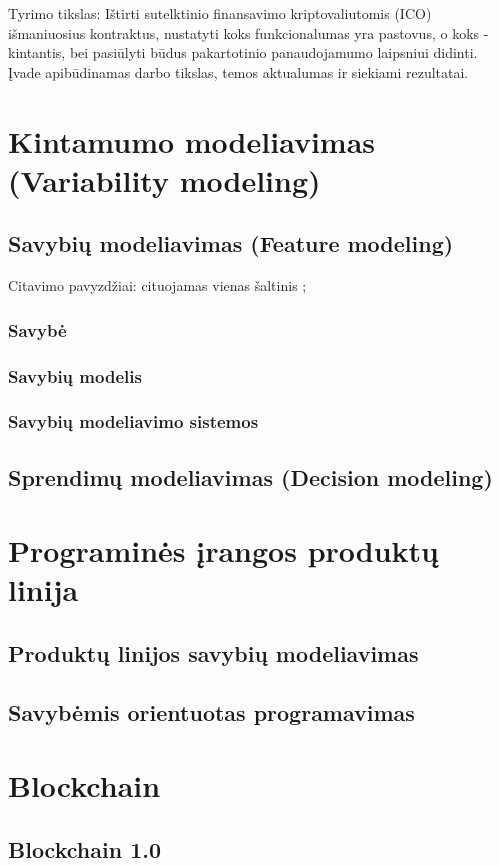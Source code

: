 \documentclass{VUMIFInfKursinis}
\begin{document}
Tyrimo tikslas: Ištirti sutelktinio finansavimo kriptovaliutomis (ICO) išmaniuosius kontraktus, nustatyti koks funkcionalumas yra pastovus, o koks - kintantis, bei pasiūlyti būdus pakartotinio panaudojamumo laipsniui didinti.
Įvade apibūdinamas darbo tikslas, temos aktualumas ir siekiami rezultatai.

\section{Kintamumo modeliavimas (Variability modeling)}

\subsection{Savybių modeliavimas (Feature modeling)}
Citavimo pavyzdžiai: cituojamas vienas šaltinis \cite{Berger2010};
\subsubsection{Savybė}
\subsubsection{Savybių modelis}
\subsubsection{Savybių modeliavimo sistemos}
\subsection{Sprendimų modeliavimas (Decision modeling)}
\section{Programinės įrangos produktų linija}
\subsection{Produktų linijos savybių modeliavimas}
\subsection{Savybėmis orientuotas programavimas}
\section{Blockchain}
\subsection{Blockchain 1.0}
\end{document}
